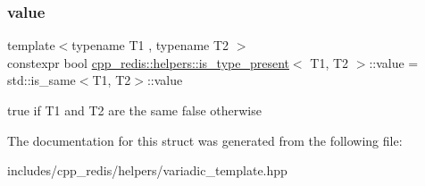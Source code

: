 \subsubsection{\texorpdfstring{value}{value}}
{\footnotesize\ttfamily template$<$typename T1 , typename T2 $>$ \\
constexpr bool \hyperlink{structcpp__redis_1_1helpers_1_1is__type__present}{cpp\+\_\+redis\+::helpers\+::is\+\_\+type\+\_\+present}$<$ T1, T2 $>$\+::value = std\+::is\+\_\+same$<$T1, T2$>$\+::value\hspace{0.3cm}{\ttfamily [static]}}

true if T1 and T2 are the same false otherwise 

The documentation for this struct was generated from the following file\+:\begin{DoxyCompactItemize}
\item 
includes/cpp\+\_\+redis/helpers/variadic\+\_\+template.\+hpp\end{DoxyCompactItemize}
